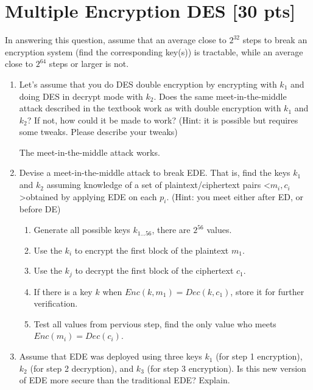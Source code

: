 \documentclass[11pt]{article}
\begin{document}
\section{Multiple Encryption DES [30 pts]}
In answering this question, assume that an average close to $2^{32}$ steps to break an encryption system (find the corresponding key(s)) is tractable, while an average close to $2^{64}$ steps or larger is not.

\begin{enumerate}
\item Let's assume that you do DES double encryption by encrypting with $k_1$ and doing DES in decrypt mode with $k_2$. Does the same meet-in-the-middle attack described in the textbook work as with double encryption with $k_1$ and $k_2$? If not, how could it be made to work? (Hint: it is possible but requires some tweaks. Please describe your tweaks)

The meet-in-the-middle attack works.

\item Devise a meet-in-the-middle attack to break EDE. That is, find the keys $k_1$ and $k_2$ assuming knowledge of a set of plaintext/ciphertext pairs \textless$m_i, c_i$\textgreater obtained by applying EDE on each $p_i$.  (Hint: you meet either after ED, or before DE)

  \begin{enumerate}
    \item Generate all possible keys $k_{1\ldots 56}$, there are $2^{56}$ values.
    \item Use the $k_{i}$ to encrypt the first block of the plaintext $m_{1}$.
    \item Use the $k_{j}$ to decrypt the first block of the ciphertext $c_{1}$.
    \item If there is a key $k$ when $Enc(k, m_{1})=Dec(k, c_{1})$, store it for further verification.
    \item Test all values from pervious step, find the only value who meets $Enc(m_{i})=Dec(c_{i})$.
  \end{enumerate}

\item Assume that EDE was deployed using three keys $k_1$ (for step 1 encryption), $k_2$ (for step 2 decryption), and $k_3$ (for step 3 encryption). Is this new version of EDE more secure than the traditional EDE? Explain.


\end{enumerate}
\end{document}
